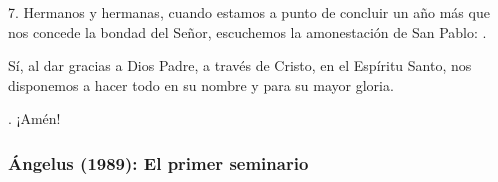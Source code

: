 \begin{body}
					7. Hermanos y hermanas, cuando estamos a punto de concluir un año más que nos concede la bondad del Señor, escuchemos la amonestación de San Pablo: .
					
					Sí, al dar gracias a Dios Padre, a través de Cristo, en el Espíritu Santo, nos disponemos a hacer todo en su nombre y para su mayor gloria.
					
					. ¡Amén!
				\end{body}
			
			\subsubsection{Ángelus (1989): El primer seminario}
			
				
